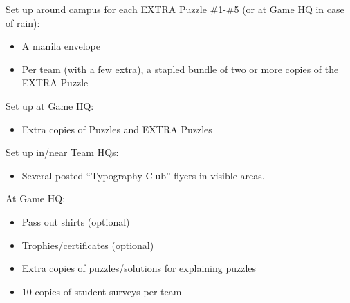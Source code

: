 \begin{printList}
\noindent
Set up around campus for each EXTRA Puzzle \#1-\#5 (or at Game HQ in case
of rain):

\begin{itemize}
  \item
  A manila envelope
  \item
  Per team (with a few extra),
  a stapled bundle of two or more copies of the EXTRA Puzzle
\end{itemize}

\noindent
Set up at Game HQ:

\begin{itemize}
  \item
  Extra copies of Puzzles and EXTRA Puzzles
\end{itemize}

\noindent
Set up in/near Team HQs:
\begin{itemize}
  \item
  Several posted ``Typography Club'' flyers in visible areas.
\end{itemize}



At Game HQ:
\begin{itemize}
  \item
  Pass out shirts (optional)
  \item
  Trophies/certificates (optional)
  \item
  Extra copies of puzzles/solutions for explaining puzzles
  \item
  10 copies of student surveys per team
\end{itemize}

\end{printList}